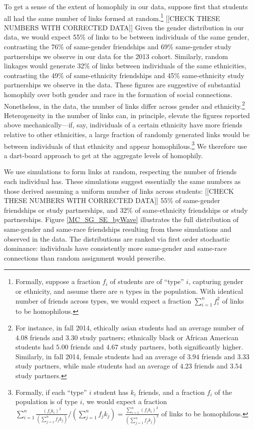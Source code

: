 \documentclass[12pt,letterpaper,english]{article}
\begin{document}
To get a sense of the extent of homophily in our data, suppose first that students all had the same number of links formed at random.\footnote{Formally, suppose a fraction $f_{i}$ of students are of ``type'' $i$, capturing gender or ethnicity, and assume there are $n$ types in the population. With identical number of friends across types, we would expect a fraction $\sum_{i=1}^{n}f_{i}^{2}$ of links to be homophilous.} [[CHECK THESE NUMBERS WITH CORRECTED DATA]] Given the gender distribution in our data, we would expect 55\% of links to be between individuals of the same gender, contrasting the 76\% of same-gender friendships and 69\% same-gender study partnerships we observe in our data for the 2013 cohort. Similarly, random linkages would generate 32\% of links between individuals of the same ethnicities, contrasting the 49\% of same-ethnicity friendships and 45\% same-ethnicity study partnerships we observe in the data. These figures are suggestive of substantial homophily over both gender and race in the formation of social connections. Nonetheless, in the data, the number of links differ across gender and ethnicity.\footnote{For instance, in fall 2014, ethically asian students had an average number of $4.08$ friends and $3.30$ study partners; ethnically black or African American students had $5.00$ friends and $4.67$ study partners, both significantly higher. Similarly, in fall 2014, female students had an average of $3.94$ friends and $3.33$ study partners, while male students had an average of $4.23$ friends and $3.54$ study partners.} Heterogeneity in the number of links can, in principle, elevate the figures reported above mechanically---if, say, individuals of a certain ethnicity have more friends relative to other ethnicities, a large fraction of randomly generated links would be between individuals of that ethnicity and appear homophilous.\footnote{Formally, if each ``type'' $i$ student has $k_i$ friends, and a fraction $f_i$ of the population is of type $i$, we would expect a fraction  $\sum_{i=1}^{n}\frac{(f_{i}k_{i})^{2}}{\left( \sum_{j=1}^{n}f_{j}k_{j}\right)}/\left( \sum_{j=1}^{n}f_{j}k_{j}\right) =\frac{\sum_{i=1}^{n}(f_{i}k_{i})^{2}}{\left( \sum_{j=1}^{n}f_{j}k_{j}\right) ^{2}}$  of links to be homophilous.} We therefore use a dart-board approach to get at the aggregate levels of homophily. 

We use simulations to form links at random, respecting the number of friends each individual has. These simulations suggest essentially the same numbers as those derived assuming a uniform number of links across students: [[CHECK THESE NUMBERS WITH CORRECTED DATA]]  55\% of same-gender friendships or study partnerships, and 32\% of same-ethnicity friendships or study partnerships. Figure \ref{MC_SG_SE_byWave} illustrates the full distribution of same-gender and same-race friendships resulting from these simulations and observed in the data. The distributions are ranked via first order stochastic dominance: individuals have consistently more same-gender and same-race connections than random assignment would prescribe.
\end{document}
